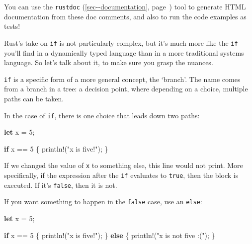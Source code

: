 \documentclass[a4paper,]{book}
\renewcommand*{\hyperref}[2][\ar]{%
  \def\ar{#2}%
  #2 (\autoref{#1}, page~\pageref{#1})}
\newenvironment{Shaded}{\begin{snugshade}}{\end{snugshade}}
\newcommand{\KeywordTok}[1]{\textcolor[rgb]{0.13,0.29,0.53}{\textbf{{#1}}}}
\newcommand{\DecValTok}[1]{\textcolor[rgb]{0.00,0.00,0.81}{{#1}}}
\newcommand{\StringTok}[1]{\textcolor[rgb]{0.31,0.60,0.02}{{#1}}}
\newcommand{\OtherTok}[1]{\textcolor[rgb]{0.56,0.35,0.01}{{#1}}}
\newcommand{\NormalTok}[1]{{#1}}
\begin{document}
You can use the \hyperref[sec--documentation]{\texttt{rustdoc}} tool to
generate HTML documentation from these doc comments, and also to run the
code examples as tests!


Rust's take on \texttt{if} is not particularly complex, but it's much
more like the \texttt{if} you'll find in a dynamically typed language
than in a more traditional systems language. So let's talk about it, to
make sure you grasp the nuances.

\texttt{if} is a specific form of a more general concept, the `branch'.
The name comes from a branch in a tree: a decision point, where
depending on a choice, multiple paths can be taken.

In the case of \texttt{if}, there is one choice that leads down two
paths:

\begin{Shaded}
\begin{Highlighting}[]
\KeywordTok{let} \NormalTok{x = }\DecValTok{5}\NormalTok{;}

\KeywordTok{if} \NormalTok{x == }\DecValTok{5} \NormalTok{\{}
    \OtherTok{println!}\NormalTok{(}\StringTok{"x is five!"}\NormalTok{);}
\NormalTok{\}}
\end{Highlighting}
\end{Shaded}

If we changed the value of \texttt{x} to something else, this line would
not print. More specifically, if the expression after the \texttt{if}
evaluates to \texttt{true}, then the block is executed. If it's
\texttt{false}, then it is not.

If you want something to happen in the \texttt{false} case, use an
\texttt{else}:

\begin{Shaded}
\begin{Highlighting}[]
\KeywordTok{let} \NormalTok{x = }\DecValTok{5}\NormalTok{;}

\KeywordTok{if} \NormalTok{x == }\DecValTok{5} \NormalTok{\{}
    \OtherTok{println!}\NormalTok{(}\StringTok{"x is five!"}\NormalTok{);}
\NormalTok{\} }\KeywordTok{else} \NormalTok{\{}
    \OtherTok{println!}\NormalTok{(}\StringTok{"x is not five :("}\NormalTok{);}
\NormalTok{\}}
\end{Highlighting}
\end{Shaded}
\end{document}
